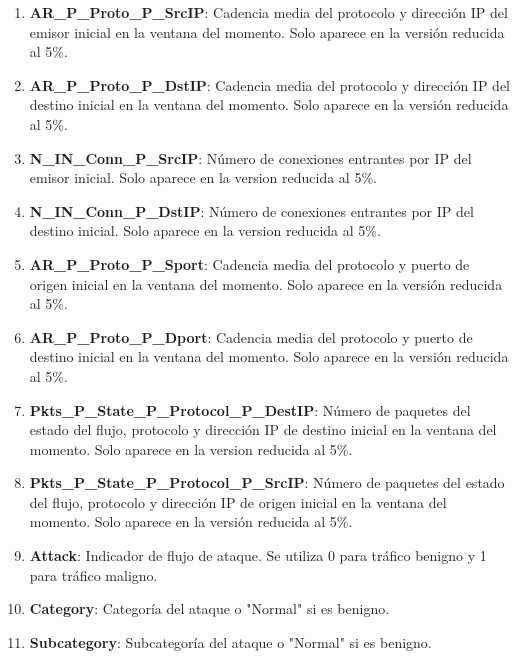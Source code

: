\begin{enumerate}
    \item \textbf{AR\_P\_Proto\_P\_SrcIP}: Cadencia media del protocolo y dirección IP del emisor inicial en la ventana del momento. Solo aparece en la versión reducida al 5\%.
    \item \textbf{AR\_P\_Proto\_P\_DstIP}: Cadencia media del protocolo y dirección IP del destino inicial en la ventana del momento. Solo aparece en la versión reducida al 5\%.
    \item \textbf{N\_IN\_Conn\_P\_SrcIP}: Número de conexiones entrantes por IP del emisor inicial. Solo aparece en la version reducida al 5\%.
    \item \textbf{N\_IN\_Conn\_P\_DstIP}: Número de conexiones entrantes por IP del destino inicial. Solo aparece en la version reducida al 5\%.
    \item \textbf{AR\_P\_Proto\_P\_Sport}: Cadencia media del protocolo y puerto  de origen inicial en la ventana del momento. Solo aparece en la versión reducida al 5\%.
    \item \textbf{AR\_P\_Proto\_P\_Dport}: Cadencia media del protocolo y puerto  de destino inicial en la ventana del momento. Solo aparece en la versión reducida al 5\%.
    \item \textbf{Pkts\_P\_State\_P\_Protocol\_P\_DestIP}: Número de paquetes del estado del flujo, protocolo y dirección IP de destino inicial en la ventana del momento. Solo aparece en la version reducida al 5\%.
    \item \textbf{Pkts\_P\_State\_P\_Protocol\_P\_SrcIP}: Número de paquetes del estado del flujo, protocolo y dirección IP de origen inicial en la ventana del momento. Solo aparece en la versión reducida al 5\%.
    \item \textbf{Attack}: Indicador de flujo de ataque. Se utiliza 0 para tráfico benigno y 1 para tráfico maligno.
    \item \textbf{Category}: Categoría del ataque o "Normal" si es benigno.
    \item \textbf{Subcategory}: Subcategoría del ataque o "Normal" si es benigno.
\end{enumerate}
